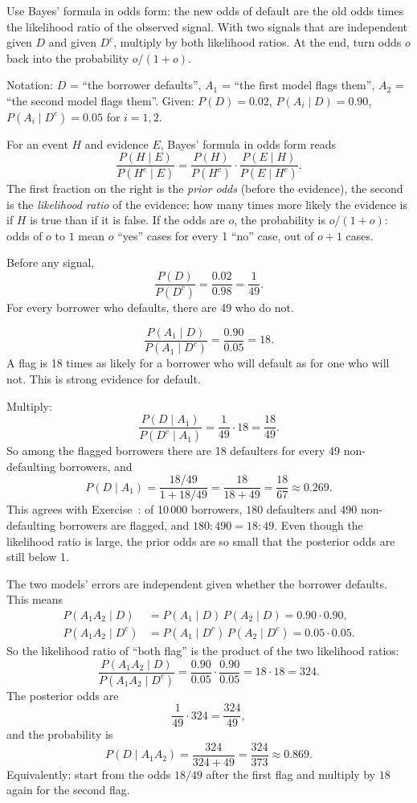 \begin{solution}
	\idea Use Bayes' formula in odds form: the new odds of default are the old
	odds times the likelihood ratio of the observed signal. With two signals
	that are independent given $D$ and given $D^c$, multiply by both likelihood
	ratios. At the end, turn odds $o$ back into the probability $o/(1+o)$.

	Notation: $D$ = ``the borrower defaults'', $A_1$ = ``the first model flags
	them'', $A_2$ = ``the second model flags them''. Given: $P(D)=0.02$,
	$P(A_i\mid D)=0.90$, $P(A_i\mid D^c)=0.05$ for $i=1,2$.

	 For an event $H$ and evidence $E$, Bayes' formula in odds
	form reads
	\[ \frac{P(H\mid E)}{P(H^c\mid E)}=\frac{P(H)}{P(H^c)}\cdot
		\frac{P(E\mid H)}{P(E\mid H^c)}. \]
	The first fraction on the right is the \emph{prior odds} (before the
	evidence), the second is the \emph{likelihood ratio} of the evidence: how
	many times more likely the evidence is if $H$ is true than if it is false.
	If the odds are $o$, the probability is $o/(1+o)$: odds of $o$ to $1$ mean
	$o$ ``yes'' cases for every 1 ``no'' case, out of $o+1$ cases.

	 Before any signal,
	\[ \frac{P(D)}{P(D^c)}=\frac{0.02}{0.98}=\frac{1}{49}. \]
	For every borrower who defaults, there are 49 who do not.

	\[ \frac{P(A_1\mid D)}{P(A_1\mid D^c)}=\frac{0.90}{0.05}=18. \]
	A flag is 18 times as likely for a borrower who will default as for one who
	will not. This is strong evidence for default.

	 Multiply:
	\[ \frac{P(D\mid A_1)}{P(D^c\mid A_1)}=\frac{1}{49}\cdot18=\frac{18}{49}. \]
	So among the flagged borrowers there are 18 defaulters for every 49
	non-defaulting borrowers, and
	\[ P(D\mid A_1)=\frac{18/49}{1+18/49}=\frac{18}{18+49}=\frac{18}{67}
		\approx0.269. \]
	This agrees with Exercise~: of 10\,000 borrowers,
	$180$ defaulters and $490$ non-defaulting borrowers are flagged, and
	$180:490=18:49$. Even though the likelihood ratio is large, the prior odds
	are so small that the posterior odds are still below 1.

	 The two models' errors are independent given whether
	the borrower defaults. This means
	\[ \begin{aligned}
			P(A_1A_2\mid D)   & =P(A_1\mid D)\,P(A_2\mid D)=0.90\cdot0.90,       \\
			P(A_1A_2\mid D^c) & =P(A_1\mid D^c)\,P(A_2\mid D^c)=0.05\cdot0.05.
		\end{aligned} \]
	So the likelihood ratio of ``both flag'' is the product of the two
	likelihood ratios:
	\[ \frac{P(A_1A_2\mid D)}{P(A_1A_2\mid D^c)}=\frac{0.90}{0.05}\cdot
		\frac{0.90}{0.05}=18\cdot18=324. \]
	The posterior odds are
	\[ \frac{1}{49}\cdot324=\frac{324}{49}, \]
	and the probability is
	\[ P(D\mid A_1A_2)=\frac{324}{324+49}=\frac{324}{373}\approx0.869. \]
	Equivalently: start from the odds $18/49$ after the first flag and multiply
	by $18$ again for the second flag.


\end{solution}
